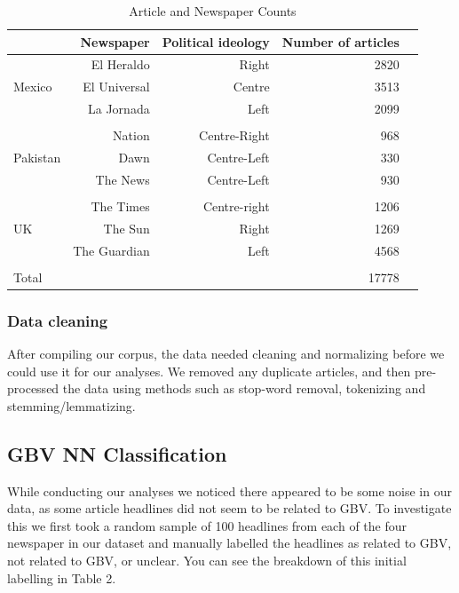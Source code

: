 \documentclass{article}
\begin{document}
{{\begin{table}[!htp]\centering
	\caption{Article and Newspaper Counts}\label{tab: }
	\scriptsize
	\begin{tabular}{lrrrr}\toprule
		&\textbf{Newspaper} &\textbf{Political ideology} &\textbf{Number of articles} \\\midrule
		\multirow{3}{*}{Mexico} &El Heraldo &Right &2820 \\
		&El Universal &Centre &3513 \\
		&La Jornada &Left &2099 \\
		& & & \\
		\multirow{3}{*}{Pakistan} &Nation &Centre-Right &968 \\
		&Dawn &Centre-Left &330 \\
		&The News &Centre-Left &930 \\
		& & & \\
		\multirow{3}{*}{UK} &The Times &Centre-right &1206 \\
		&The Sun &Right &1269 \\
		&The Guardian &Left &4568 \\
		& & & \\
		Total & & &17778 \\
		\bottomrule
	\end{tabular}
\end{table}

\subsubsection{Data cleaning}{
After compiling our corpus, the data needed cleaning and normalizing before we could use it for our analyses. We removed any duplicate articles, and then pre-processed the data using methods such as stop-word removal, tokenizing and stemming/lemmatizing.}

}

\subsection{GBV NN Classification}{
While conducting our analyses we noticed there appeared to be some noise in our data, as some article headlines did not seem to be related to GBV. To investigate this we first took a random sample of 100 headlines from each of the four newspaper in our dataset and manually labelled the headlines as related to GBV, not related to GBV, or unclear. You can see the breakdown of this initial labelling in Table 2.

}}
\end{document}
